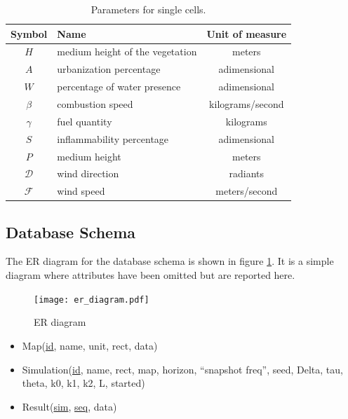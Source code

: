 \documentclass[Lau]{sapthesis} %
\begin{document}
\begin{table}
\centering
\begin{tabular}{|c|l|c|}
	\hline
	\textbf{Symbol} & \textbf{Name} & \textbf{Unit of measure}\\
	\hline
	$H$ & medium height of the vegetation & meters\\
	$A$ & urbanization percentage & adimensional\\
	$W$ & percentage of water presence & adimensional\\
	$\beta$ & combustion speed & kilograms/second\\
	$\gamma$ & fuel quantity & kilograms\\
	$S$ & inflammability percentage & adimensional\\
	$P$ & medium height & meters\\
	$\mathcal{D}$ & wind direction & radiants\\
	$\mathcal{F}$ & wind speed & meters/second\\
	\hline
\end{tabular}
\caption{Parameters for single cells.}
\label{tab:params}
\end{table}

\subsection{Database Schema}\label{sec:schema}

The ER diagram for the database schema is shown in figure \ref{fig:er}. It is a
simple diagram where attributes have been omitted but are reported here.

\begin{figure} %
\centering
\setlength{\unitlength}{1cm}
\texttt{[image: er\_diagram.pdf]}
\caption{ER diagram}
\label{fig:er}
\end{figure}

\begin{itemize}
\item Map(\underline{id}, name, unit, rect, data)
\item Simulation(\underline{id}, name, rect, map, horizon, ``snapshot freq'',
seed, Delta, tau, theta, k0, k1, k2, L, started)
\item Result(\underline{sim}, \underline{seq}, data)
\end{itemize}
\end{document}
